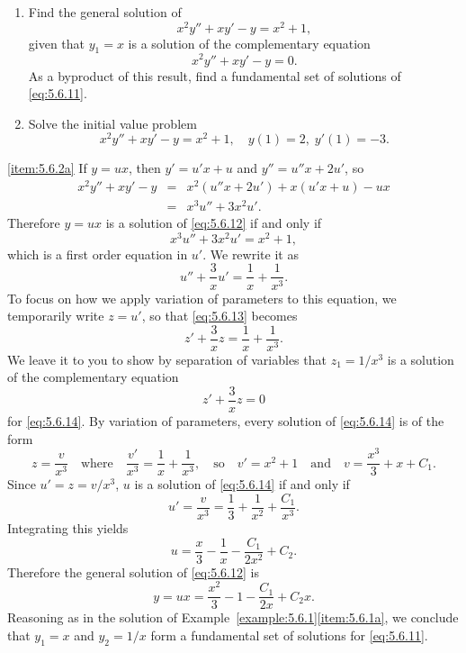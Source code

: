 \documentclass{ximera}
\begin{document}
\begin{example}\label{example:5.6.2}
\begin{enumerate}
\item \label{item:5.6.2a} %
Find the general solution of
$$
x^2y''+xy'-y=x^2+1,
$$
 given that $y_1=x$ is a solution of the complementary
equation
\begin{equation}  \label{eq:5.6.11}
x^2y''+xy'-y=0.
\end{equation}
  As a byproduct of this result, find a fundamental set of
solutions of \eqref{eq:5.6.11}.

\item \label{item:5.6.2b}%
Solve the initial value problem
\begin{equation}  \label{eq:5.6.12}
x^2y''+xy'-y=x^2+1, \quad   y(1)=2,\;  y'(1)=-3.
\end{equation}
\end{enumerate}


\begin{explanation}\ref{item:5.6.2a} If $y=ux$, then $y'=u'x+u$ and $y''=u''x+2u'$, so
\begin{eqnarray*}
x^2y''+xy'-y&=&x^2(u''x+2u')+x(u'x+u)-ux\\
&=&x^3u''+3x^2u'.
\end{eqnarray*}
Therefore $y=ux$ is a solution of \eqref{eq:5.6.12} if and only if
$$
x^3u''+3x^2u'=x^2+1,
$$
which is a first order equation in $u'$.
We rewrite it as
\begin{equation} \label{eq:5.6.13}
u''+\frac{3}{x}u'=\frac{1}{x}+\frac{1}{x^3}.
\end{equation}
To focus on how we apply variation of parameters to this equation, we
temporarily write $z=u'$, so that \eqref{eq:5.6.13} becomes
\begin{equation} \label{eq:5.6.14}
z'+\frac{3}{x}z=\frac{1}{x}+\frac{1}{x^3}.
\end{equation}
We leave it to you to show by separation of variables that
$z_1=1/x^3$ is a solution of the complementary equation
$$
z'+\frac{3}{x}z=0
$$
for \eqref{eq:5.6.14}. By variation of parameters, every solution of
\eqref{eq:5.6.14} is of the form
$$
z=\frac{v}{x^3}\quad\mbox{where}\quad
\frac{v'}{x^3}=\frac{1}{x}+\frac{1}{x^3}, \quad\mbox{so}\quad
 v'=x^2+1 \quad\mbox{and}\quad v=\frac{x^3}{3}+x+C_1.
$$
Since $u'=z=v/x^3$,   $u$ is a solution of \eqref{eq:5.6.14} if and only
if
$$
u'=\frac{v}{x^3}=\frac{1}{3}+\frac{1}{x^2}+\frac{C_1}{x^3}.
$$
Integrating this yields
$$
u=\frac{x}{3}-\frac{1}{x}-\frac{C_1}{2x^2}+C_2.
$$
Therefore the general solution of  \eqref{eq:5.6.12} is
\begin{equation} \label{eq:5.6.15}
y=ux=\frac{x^2}{3}-1-\frac{C_1}{2x}+C_2x.
\end{equation}
Reasoning as in  the solution of
Example~\ref{example:5.6.1}\ref{item:5.6.1a}, we  conclude that $y_1=x$ and $y_2=1/x$
form a fundamental set of solutions for \eqref{eq:5.6.11}.


\end{explanation}
\end{example}
\end{document}
